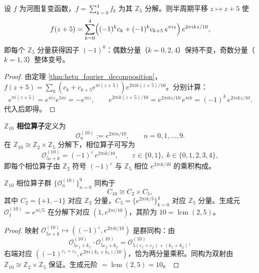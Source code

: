 \begin{proposition}[河图复变函数的半周期平移]\label{prop:hetu_yin_yang_flip}
设 $f$ 为河图复变函数，$f = \sum_{k=0}^{4} f_k$ 为其 $\mathbb{Z}_5$ 分解。则半周期平移 $z \mapsto z + 5$ 使
\[
f(z + 5) = \sum_{k=0}^{4} \Bigl( (-1)^k c_k + (-1)^k c_{k+5}\, e^{\pi i z} \Bigr)\, e^{2\pi i k z / 10},
\]
即每个 $\mathbb{Z}_5$ 分量获得因子 $(-1)^k$：偶数分量（$k = 0, 2, 4$）保持不变，奇数分量（$k = 1, 3$）整体变号。
\end{proposition}

\begin{proof}
由定理 \ref{thm:hetu_fourier_decomposition}，$f(z+5) = \sum_k (c_k + c_{k+5} e^{\pi i (z+5)}) e^{2\pi i k (z+5)/10}$。分别计算：
\[
e^{\pi i (z+5)} = e^{\pi i z} e^{5\pi i} = -e^{\pi i z},\qquad
e^{2\pi i k (z+5)/10} = e^{2\pi i k z / 10}\, e^{\pi i k} = (-1)^k\, e^{2\pi i k z / 10}.
\]
代入后即得。
\end{proof}

\begin{definition}\label{def:hetu_phase_operator}
\textbf{$\mathbb{Z}_{10}$ 相位算子}定义为
\[
\mathcal{O}_n^{(10)} := e^{2\pi i n / 10}, \qquad n = 0, 1, \dots, 9.
\]
在 $\mathbb{Z}_{10} \cong \mathbb{Z}_2 \times \mathbb{Z}_5$ 分解下，相位算子可写为
\[
\mathcal{O}_{5\varepsilon + k}^{(10)} = (-1)^\varepsilon\, e^{2\pi i k / 10}, \qquad \varepsilon \in \{0, 1\}, \; k \in \{0, 1, 2, 3, 4\},
\]
即每个相位算子由 $\mathbb{Z}_2$ 符号 $(-1)^\varepsilon$ 与 $\mathbb{Z}_5$ 相位 $e^{2\pi i k / 10}$ 的乘积构成。
\end{definition}

\begin{proposition}\label{prop:hetu_phase_group}
$\mathbb{Z}_{10}$ 相位算子群 $\{\mathcal{O}_n^{(10)}\}_{n=0}^{9}$ 同构于
\[
C_{10} \cong C_2 \times C_5,
\]
其中 $C_2 = \{+1, -1\}$ 对应 $\mathbb{Z}_2$ 分量，$C_5 = \{e^{2\pi i k/5}\}_{k=0}^{4}$ 对应 $\mathbb{Z}_5$ 分量。生成元 $\mathcal{O}_1^{(10)} = e^{\pi i / 5}$ 在分解下对应 $(1, e^{2\pi i / 10})$，其阶为 $10 = \operatorname{lcm}(2, 5)$。
\end{proposition}

\begin{proof}
映射 $\mathcal{O}_{5\varepsilon + k}^{(10)} \mapsto ((-1)^\varepsilon, e^{2\pi i k / 10})$ 是群同构：由
\[
\mathcal{O}_{5\varepsilon_1 + k_1}^{(10)} \cdot \mathcal{O}_{5\varepsilon_2 + k_2}^{(10)} = \mathcal{O}_{5(\varepsilon_1 + \varepsilon_2) + (k_1 + k_2)}^{(10)},
\]
右端对应 $((-1)^{\varepsilon_1 + \varepsilon_2}, e^{2\pi i (k_1 + k_2)/10})$，恰为两分量乘积。同构为双射由 $\mathbb{Z}_{10} \cong \mathbb{Z}_2 \times \mathbb{Z}_5$ 保证。生成元阶 $= \operatorname{lcm}(2, 5) = 10$。
\end{proof}

